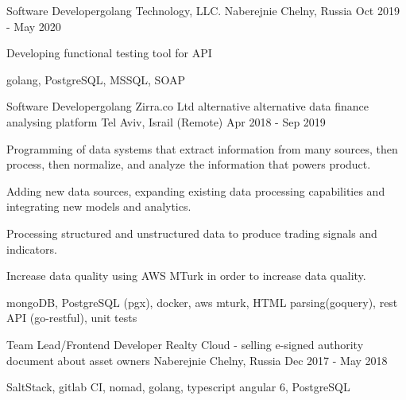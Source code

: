 \begin{cventries}
  \cventry
    {Software Developer{\enskip\cdotp\enskip}golang} %
    {Technology, LLC.} %
    {Naberejnie Chelny, Russia} %
    {Oct 2019 - May 2020} %
    {
      \begin{cvitems} %
        \item {Developing functional testing tool for API}
        \item {golang, PostgreSQL, MSSQL, SOAP}
      \end{cvitems}
    }

  \cventry
    {Software Developer{\enskip\cdotp\enskip}golang} %
    {Zirra.co Ltd alternative alternative data finance analysing platform} %
    {Tel Aviv, Israil (Remote)} %
    {Apr 2018 - Sep 2019} %
    {
      \begin{cvitems} %
        \item {Programming of data systems that extract information from many sources, then process, then normalize, and analyze the information that powers product.}
        \item {Adding new data sources, expanding existing data processing capabilities and integrating new models and analytics.}
        \item {Processing structured and unstructured data to produce trading signals and indicators.}
        \item {Increase data quality using AWS MTurk in order to increase data quality.}
        \item {mongoDB, PostgreSQL (pgx), docker, aws mturk, HTML parsing(goquery), rest API (go-restful), unit tests}
      \end{cvitems}
    }

  \cventry
    {Team Lead/Frontend Developer} %
    {Realty Cloud - selling e-signed authority document about asset owners} %
    {Naberejnie Chelny, Russia} %
    {Dec 2017 - May 2018} %
    {
      \begin{cvitems} %
        \item {SaltStack, gitlab CI, nomad, golang, typescript angular 6, PostgreSQL}
      \end{cvitems}
    }


\end{cventries}

